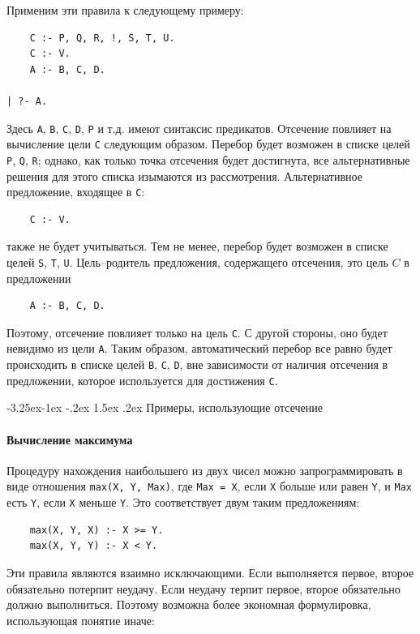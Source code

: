 \documentclass[12pt, openany, twoside]{book} %
\makeatletter
\renewcommand\subsection{\@startsection{subsection}{2}{\z@}%
                                     {-3.25ex\@plus -1ex \@minus -.2ex}%
                                     {1.5ex \@plus .2ex}%
                                     {\normalfont\normalsize\bfseries}}
\makeatother
\begin{document}
Применим эти правила к следующему примеру:
{\tt \begin{verbatim}
    С :- Р, Q, R, !, S, Т, U.
    С :- V.
    А :- В, С, D.

| ?- А.
\end{verbatim}}

Здесь {\tt А}, {\tt В}, {\tt С}, {\tt D}, {\tt P} и т.д. имеют синтаксис предикатов. Отсечение повлияет на вычисление цели {\tt С} следующим образом. Перебор будет возможен в списке целей {\tt Р}, {\tt Q}, {\tt R}; однако, как только точка отсечения будет достигнута, все альтернативные решения для этого списка изымаются из рассмотрения. Альтернативное предложение, входящее в {\tt С}:
{\tt \begin{verbatim}
    С :- V.
\end{verbatim}}
\noindent также не будет учитываться. Тем не менее, перебор будет возможен в списке целей {\tt S}, {\tt T}, {\tt U}. Цель--родитель предложения, содержащего отсечения, это цель $C$ в предложении
{\tt \begin{verbatim}
    А :- В, С, D.
\end{verbatim}}

Поэтому, отсечение повлияет только на цель {\tt С}. С другой стороны, оно будет невидимо из цели {\tt А}. Таким образом, автоматический перебор все равно будет происходить в списке целей {\tt В}, {\tt С}, {\tt D}, вне зависимости от наличия отсечения в предложении, которое используется для достижения {\tt С}.

\subsection{Примеры, использующие отсечение}
\paragraph{Вычисление максимума}
Процедуру нахождения наибольшего из двух чисел можно запрограммировать в виде отношения {\tt max(X, Y, Мах)}, где {\tt Мах = X}, если {\tt X} больше или равен {\tt Y}, и {\tt Мах} есть {\tt Y}, если {\tt X} меньше {\tt Y}. Это соответствует двум таким предложениям:

{\tt \begin{verbatim}
    max(X, Y, X) :- X >= Y.
    max(X, Y, Y) :- X < Y.
\end{verbatim}}

Эти правила являются взаимно исключающими. Если выполняется первое, второе обязательно потерпит неудачу. Если неудачу терпит первое, второе обязательно должно выполниться. Поэтому возможна более экономная формулировка, использующая понятие иначе:
\end{document}
